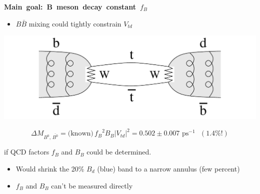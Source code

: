 \documentclass[landscape]{article}
\newenvironment{slide}[1][ ]{\mbox{\bf #1 } \vfill}{\vfill \mbox{ } \pagebreak}
\begin{document}
\begin{slide}[Main goal: B meson decay constant \boldmath $f_B$]

\begin{minipage}{14 cm} \begin{itemize} \item $B\bar{B}$ mixing could tightly constrain $V_{td}$ \end{itemize} \end{minipage} \hfill \begin{minipage}{10 cm} \begin{center} \includegraphics[width=10 cm]{diagram_bmixing} \end{center} \end{minipage}
\[ \Delta M_{B^0,\,\bar{B^0}} = \mbox{(known)} \, {f_B}^2 B_B |V_{td}|^2 = 0.502 \pm 0.007 \mbox{ ps}^{-1} \mbox{ } (1.4\%!) \]

\vspace{0.5 cm}
\mbox{\hspace{0.8 cm}} if QCD factors $f_B$ and $B_B$ could be determined.

\vfill

\begin{minipage}{14 cm}
\begin{itemize}
\item Would shrink the 20\% $B_d$ (blue) band to a narrow annulus (few percent)

\vspace{1 cm}

\item $f_B$ and $B_B$ can't be measured directly

\vspace{1 cm}


\end{itemize}
\end{minipage}
\end{slide}
\end{document}
